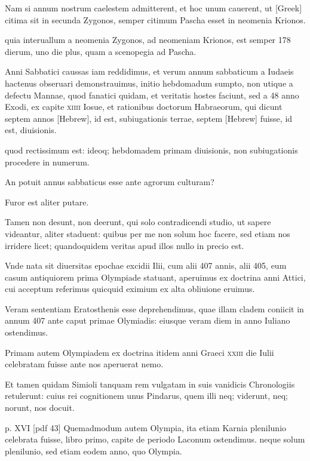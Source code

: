 \begin{parnumbers}
Nam si annum
nostrum caelestem admitterent, et hoc unum cauerent, ut \textgreek{[Greek]}
citima sit in secunda Zygonos, semper citimum Pascha esset in neomenia
Krionos.

quia interuallum a neomenia Zygonos, ad neomeniam
Krionos, est semper 178 dierum, uno die plus, quam a scenopegia
ad Pascha.

Anni Sabbatici caussas iam reddidimus, et verum
annum sabbaticum a Iudaeis hactenus obseruari demonstrauimus,
initio hebdomadum sumpto, non utique a defectu Mannae,
quod fanatici quidam, et veritatis hostes faciunt, sed a 48 anno Exodi,
ex capite \textsc{xiiii} Iosue, et rationibus doctorum Habraeorum, qui
dicunt septem annos \texthebrew{[Hebrew]}, id est, subiugationis terrae,
septem \texthebrew{[Hebrew]}
fuisse, id est, diuisionis.

quod rectissimum est: ideoq; hebdomadem
primam diuisionis, non subiugationis procedere in numerum.

An
potuit annus sabbaticus esse ante agrorum culturam?

Furor est aliter putare.

Tamen non desunt, non deerunt, qui solo contradicendi
studio, ut sapere videantur, aliter staduent: quibus per me non solum
hoc facere, sed etiam nos irridere licet; quandoquidem veritas apud
illos nullo in precio est.

Vnde nata sit diuersitas epochae excidii Ilii,
cum alii 407 annis, alii 405, eum casum antiquiorem prima Olympiade
statuant, aperuimus ex doctrina anni Attici, cui acceptum
referimus quicquid eximium ex alta obliuione eruimus.

Veram sententiam
Eratosthenis esse deprehendimus, quae illam cladem coniicit
in annum 407 ante caput primae Olymiadis: eiusque veram
diem in anno Iuliano ostendimus.

Primam autem Olympiadem
ex doctrina itidem anni Graeci \textsc{xxiii} die Iulii celebratam fuisse ante
nos aperuerat nemo.

Et tamen quidam Simioli tanquam rem
vulgatam in suis vanidicis Chronologiis retulerunt: cuius rei cognitionem
unus Pindarus, quem illi neq; viderunt, neq; norunt, nos
docuit.


\clearpage
p. XVI [pdf 43]
Quemadmodum autem Olympia, ita etiam Karnia plenilunio
celebrata fuisse, libro primo, capite de periodo Laconum
ostendimus. neque solum plenilunio, sed etiam eodem anno, quo
Olympia.


\end{parnumbers}
